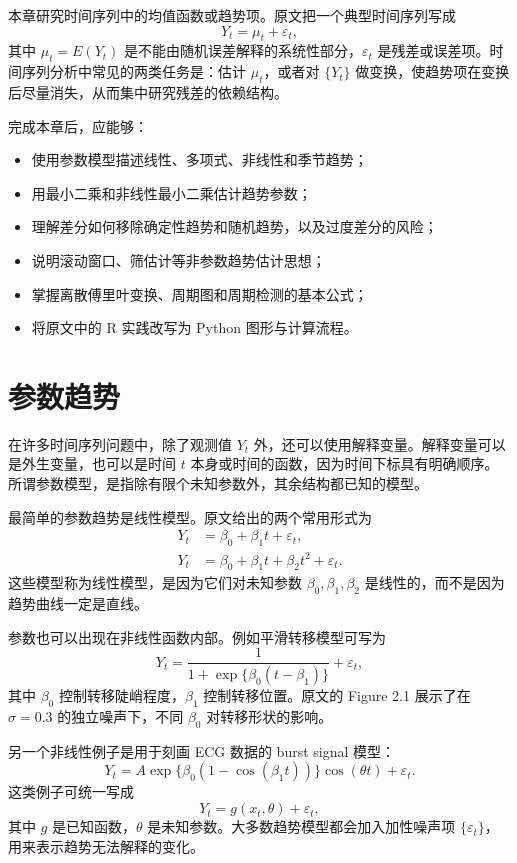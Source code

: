 \documentclass[11pt,a4paper,openany]{ctexbook}
\begin{document}
本章研究时间序列中的均值函数或趋势项。原文把一个典型时间序列写成
\[
  Y_t=\mu_t+\varepsilon_t,
\]
其中 \(\mu_t=E(Y_t)\) 是不能由随机误差解释的系统性部分，\(\varepsilon_t\) 是残差或误差项。时间序列分析中常见的两类任务是：估计 \(\mu_t\)，或者对 \(\{Y_t\}\) 做变换，使趋势项在变换后尽量消失，从而集中研究残差的依赖结构。

完成本章后，应能够：
\begin{itemize}
  \item 使用参数模型描述线性、多项式、非线性和季节趋势；
  \item 用最小二乘和非线性最小二乘估计趋势参数；
  \item 理解差分如何移除确定性趋势和随机趋势，以及过度差分的风险；
  \item 说明滚动窗口、筛估计等非参数趋势估计思想；
  \item 掌握离散傅里叶变换、周期图和周期检测的基本公式；
  \item 将原文中的 R 实践改写为 Python 图形与计算流程。
\end{itemize}

\section{参数趋势}

在许多时间序列问题中，除了观测值 \(Y_t\) 外，还可以使用解释变量。解释变量可以是外生变量，也可以是时间 \(t\) 本身或时间的函数，因为时间下标具有明确顺序。所谓参数模型，是指除有限个未知参数外，其余结构都已知的模型。

最简单的参数趋势是线性模型。原文给出的两个常用形式为
\begin{align}
  Y_t &= \beta_0+\beta_1 t+\varepsilon_t, \tag{2.1}\\
  Y_t &= \beta_0+\beta_1 t+\beta_2 t^2+\varepsilon_t. \tag{2.2}
\end{align}
这些模型称为线性模型，是因为它们对未知参数 \(\beta_0,\beta_1,\beta_2\) 是线性的，而不是因为趋势曲线一定是直线。

参数也可以出现在非线性函数内部。例如平滑转移模型可写为
\begin{equation}
  Y_t=\frac{1}{1+\exp\{\beta_0(t-\beta_1)\}}+\varepsilon_t, \tag{2.3}
\end{equation}
其中 \(\beta_0\) 控制转移陡峭程度，\(\beta_1\) 控制转移位置。原文的 Figure 2.1 展示了在 \(\sigma=0.3\) 的独立噪声下，不同 \(\beta_0\) 对转移形状的影响。

另一个非线性例子是用于刻画 ECG 数据的 burst signal 模型：
\begin{equation}
  Y_t=A\exp\{\beta_0(1-\cos(\beta_1 t))\}\cos(\theta t)+\varepsilon_t. \tag{2.4}
\end{equation}
这类例子可统一写成
\begin{equation}
  Y_t=g(x_t,\theta)+\varepsilon_t, \tag{2.5}
\end{equation}
其中 \(g\) 是已知函数，\(\theta\) 是未知参数。大多数趋势模型都会加入加性噪声项 \(\{\varepsilon_t\}\)，用来表示趋势无法解释的变化。
\end{document}
